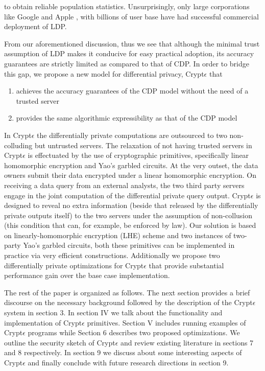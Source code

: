 to obtain reliable population statistics. Unsurprisingly, only large corporations  like Google \cite{Rappor1,Rappor2,Prochlo} and Apple \cite{Apple}, with  billions of user base have had successful commercial deployment of LDP. %
\par
From our aforementioned discussion, thus we see that although the minimal trust assumption of LDP makes it conducive for easy practical adoption, its accuracy guarantees are strictly limited as compared to that of CDP. In order to bridge this gap, we propose a new model for differential privacy, Crypt$\epsilon$ that  \begin{enumerate}\item achieves the accuracy guarantees of the CDP model without the need of a trusted server \item provides the same algorithmic expressibility as that of the CDP model \end{enumerate} In Crypt$\epsilon$ the differentially private computations are outsourced to two non-colluding but untrusted servers. The relaxation of not having trusted servers in Crypt$\epsilon$ is effectuated by the use of cryptographic primitives, specifically linear homomorphic encryption and Yao's garbled circuits.  At the very outset, the data owners submit their data encrypted under a linear homomorphic encryption. On receiving a data query from an external analysts, the two third party servers engage in the joint computation of the differential private query output. Crypt$\epsilon$ is designed to reveal no extra information (beside that released by the differentially private outputs itself) to
the two servers under the assumption of  non-collusion (this condition that can, for example, be enforced by law). Our solution is  based on linearly-homomorphic
encryption (LHE) scheme and two instances of two-party Yao's garbled circuits, both these primitives can be implemented in practice via very efficient constructions. Additionally we propose two differentially private optimizations for Crypt$\epsilon$ that provide substantial performance gain over the base case implementation.
\par The rest of the paper is organized as follows. The next section provides a brief discourse on the necessary background followed by the description of the Crypt$\epsilon$ system in section 3. In section IV we talk about the functionality and implementation of Crypt$\epsilon$ primitives. Section V includes running examples of Crypt$\epsilon$ programs while Section 6 describes two proposed optimizations. We outline the security sketch of Crypt$\epsilon$ and review existing literature in sections 7 and 8 respectively. In section 9 we discuss about some interesting aspects of Crypt$\epsilon$ and finally conclude with future research directions in section 9. 
